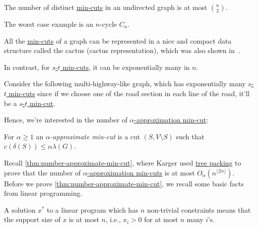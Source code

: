\begin{theorem}
	The number of distinct \hyperref[prb:global-min-cut]{min-cuts} in an undirected graph is at most \(\binom{n}{2}\).
\end{theorem}

\begin{eg}[Cycle]
	The worst case example is an \(n\)-cycle \(C_n\).
\end{eg}

\begin{remark}
	All the \hyperref[prb:global-min-cut]{min-cuts} of a graph can be represented in a nice and compact data structure called the cactus (cactus representation), which was also shown in~\cite{dinitz1976structure}.
\end{remark}

In contrast, for \hyperref[prb:s-t-min-cut]{\(s\)-\(t\) min-cuts}, it can be exponentially many in \(n\).

\begin{eg}
	Consider the following multi-highway-like graph, which has exponentially many \hyperref[prb:s-t-min-cut]{\(s\)-\(t\) min-cuts} since if we choose one of the road section in each line of the road, it'll be a \hyperref[prb:s-t-min-cut]{\(s\)-\(t\) min-cut}.
	\begin{center}
	\end{center}
\end{eg}

Hence, we're interested in the number of \hyperref[def:approximate-min-cut]{\(\alpha \)-approximation min-cut}:

\begin{definition}\label{def:approximate-min-cut}
	For \(\alpha \geq 1\) an \emph{\(\alpha \)-approximate min-cut} is a cut \((S, V \setminus S)\) such that \(c(\delta (S)) \leq \alpha \lambda (G)\).
\end{definition}

Recall \autoref{thm:number-approximate-min-cut}, where Karger used \hyperref[prb:TP]{tree packing} to prove that the number of \hyperref[def:approximate-min-cut]{\(\alpha \)-approximation min-cuts} is at most \(O_\alpha (n^{\lfloor 2\alpha \rfloor })\). Before we prove \autoref{thm:number-approximate-min-cut}, we recall some basic facts from linear programming.

\begin{prev}
	A solution \(x^{\ast} \) to a linear program which has \(n\) non-trivial constraints means that the support size of \(x\) is at most \(n\), i.e., \(x_i > 0\) for at most \(n\) many \(i\)'s.
\end{prev}

